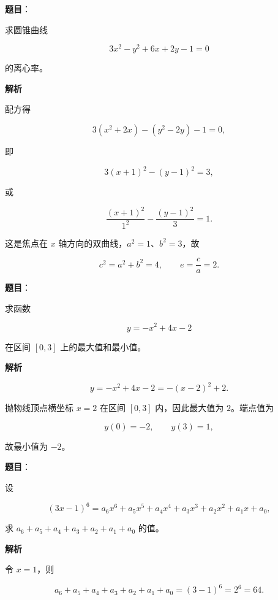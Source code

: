 \begin{answer}

\textbf{题目}：

求圆锥曲线

\nopagebreak[4]
\[
3x^2-y^2+6x+2y-1=0
\]

的离心率。

\textbf{解析}

配方得

\nopagebreak[4]
\[
3(x^2+2x)-(y^2-2y)-1=0,
\]

即

\nopagebreak[4]
\[
3(x+1)^2-(y-1)^2=3,
\]

或

\nopagebreak[4]
\[
\frac{(x+1)^2}{1^2}-\frac{(y-1)^2}{3}=1.
\]

这是焦点在 $x$ 轴方向的双曲线，$a^2=1$、$b^2=3$，故

\nopagebreak[4]
\[
c^2=a^2+b^2=4,\qquad e=\frac ca=2.
\]


\end{answer}
\begin{answer}

\textbf{题目}：

求函数

\nopagebreak[4]
\[
y=-x^2+4x-2
\]

在区间 $[0,3]$ 上的最大值和最小值。

\textbf{解析}

\nopagebreak[4]
\[
y=-x^2+4x-2=-(x-2)^2+2.
\]

抛物线顶点横坐标 $x=2$ 在区间 $[0,3]$ 内，因此最大值为 $2$。端点值为

\nopagebreak[4]
\[
y(0)=-2,\qquad y(3)=1,
\]

故最小值为 $-2$。


\end{answer}
\begin{answer}

\textbf{题目}：

设

\nopagebreak[4]
\[
(3x-1)^6=a_6x^6+a_5x^5+a_4x^4+a_3x^3+a_2x^2+a_1x+a_0,
\]

求 $a_6+a_5+a_4+a_3+a_2+a_1+a_0$ 的值。

\textbf{解析}

令 $x=1$，则

\nopagebreak[4]
\[
a_6+a_5+a_4+a_3+a_2+a_1+a_0=(3-1)^6=2^6=64.
\]


\end{answer}
